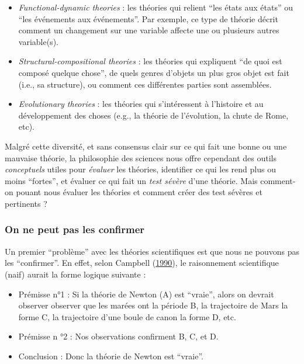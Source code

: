 \documentclass[
  a4paper,11pt,twoside,onecolumn,openright,final,oldfontcommands]{memoir}
\theoremstyle{definition}
\theoremstyle{definition}
\theoremstyle{definition}
\theoremstyle{definition}
\theoremstyle{remark}
\begin{document}
\begin{itemize}
\item
  \emph{Functional-dynamic theories} : les théories qui relient ``les états aux états'' ou ``les événements aux événements''. Par exemple, ce type de théorie décrit comment un changement sur une variable affecte une ou plusieurs autres variable(s).
\item
  \emph{Structural-compositional theories} : les théories qui expliquent ``de quoi est composé quelque chose'', de quels genres d'objets un plus gros objet est fait (i.e., sa structure), ou comment ces différentes parties sont assemblées.
\item
  \emph{Evolutionary theories} : les théories qui s'intéressent à l'histoire et au développement des choses (e.g., la théorie de l'évolution, la chute de Rome, etc).
\end{itemize}

Malgré cette diversité, et sans consensus clair sur ce qui fait une bonne ou une mauvaise théorie, la philosophie des sciences nous offre cependant des outils \emph{conceptuels} utiles pour \emph{évaluer} les théories, identifier ce qui les rend plus ou moins ``fortes'', et évaluer ce qui fait un \emph{test sévère} d'une théorie. Mais comment-on pouant nous évaluer les théories et comment créer des test sévères et pertinents ?

\hypertarget{on-ne-peut-pas-les-confirmer}{%
\subsubsection{On ne peut pas les confirmer}\label{on-ne-peut-pas-les-confirmer}}

Un premier ``problème'' avec les théories scientifiques est que nous ne pouvons pas les ``confirmer''. En effet, selon Campbell (\protect\hyperlink{ref-campbell_meehlian_1990}{1990}), le raisonnement scientifique (naif) aurait la forme logique suivante :

\begin{itemize}
\item
  Prémisse n°1 : Si la théorie de Newton (A) est ``vraie'', alors on devrait observer observer que les marées ont la période B, la trajectoire de Mars la forme C, la trajectoire d'une boule de canon la forme D, etc.
\item
  Prémisse n °2 : Nos observations confirment B, C, et D.
\item
  Conclusion : Donc la théorie de Newton est ``vraie''.
\end{itemize}
\end{document}
